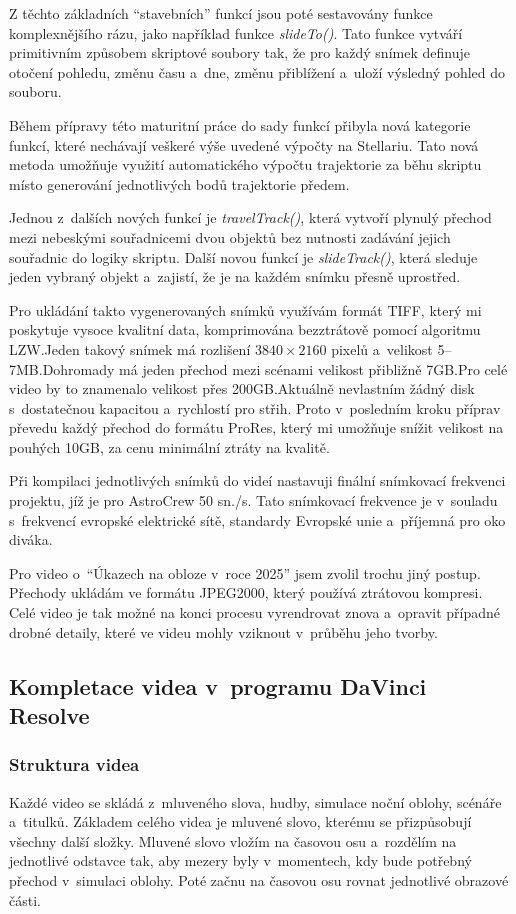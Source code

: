 \documentclass[12pt,a4paper,titlepage]{article}
\begin{document}
Z těchto základních \enquote{stavebních} funkcí jsou poté sestavovány funkce komplexnějšího rázu, jako například funkce \textit{slideTo()}. Tato funkce vytváří primitivním způsobem skriptové soubory tak, že pro každý snímek definuje otočení pohledu, změnu času a~dne, změnu přiblížení a~uloží výsledný pohled do souboru. %

Během přípravy této maturitní práce do sady funkcí přibyla nová kategorie funkcí, které nechávají veškeré výše uvedené výpočty na Stellariu. Tato nová metoda umožňuje využití automatického výpočtu trajektorie za běhu skriptu místo generování jednotlivých bodů trajektorie předem. 

Jednou z~dalších nových funkcí je \textit{travelTrack()}, která vytvoří plynulý přechod mezi nebeskými souřadnicemi dvou objektů bez nutnosti zadávání jejich souřadnic do logiky skriptu. Další novou funkcí je \textit{slideTrack()}, která sleduje jeden vybraný objekt a~zajistí, že je na každém snímku přesně uprostřed. %

Pro ukládání takto vygenerovaných snímků využívám formát TIFF, který mi poskytuje vysoce kvalitní data, komprimována bezztrátově pomocí algoritmu LZW.\@ Jeden takový snímek má rozlišení \(3840\times2160\) pixelů a~velikost 5--7MB.\@ Dohromady má jeden přechod mezi scénami velikost přibližně 7GB.\@ Pro celé video by to znamenalo velikost přes 200GB.\@ Aktuálně nevlastním žádný disk s~dostatečnou kapacitou a~rychlostí pro střih. Proto v~posledním kroku příprav převedu každý přechod do formátu ProRes, který mi umožňuje snížit velikost na pouhých 10GB, za cenu minimální ztráty na kvalitě. 

Při kompilaci jednotlivých snímků do videí nastavuji finální snímkovací frekvenci projektu, jíž je pro AstroCrew 50 sn./s. Tato snímkovací frekvence je v~souladu s~frekvencí evropské elektrické sítě, standardy Evropské unie a~příjemná pro oko diváka.

Pro video o~\enquote{Úkazech na obloze v~roce 2025} jsem zvolil trochu jiný postup. Přechody ukládám ve formátu JPEG2000, který používá ztrátovou kompresi. Celé video je tak možné na konci procesu vyrendrovat znova a~opravit případné drobné detaily, které ve videu mohly vziknout v~průběhu jeho tvorby.
\subsection{Kompletace videa v~programu DaVinci Resolve}\label{makingof:resolve}
\subsubsection{Struktura videa}\label{makingof:resolve:structure}
Každé video se skládá z~mluveného slova, hudby, simulace noční oblohy, scénáře a~titulků. Základem celého videa je mluvené slovo, kterému se přizpůsobují všechny další složky. Mluvené slovo vložím na časovou osu a~rozdělím na jednotlivé odstavce tak, aby mezery byly v~momentech, kdy bude potřebný přechod v~simulaci oblohy. Poté začnu na časovou osu rovnat jednotlivé obrazové části.
\end{document}

